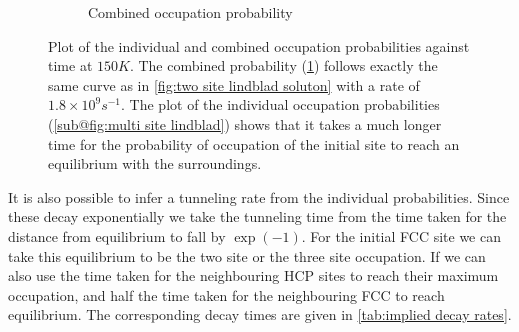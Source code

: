 \begin{figure}[htbp]
\begin{subfigure}{0.45\linewidth}
        \caption{Combined occupation probability
        }\label{sub@fig:multi site combined lindblad}
    \end{subfigure}
    \caption{Plot of the individual and combined
    occupation probabilities against time at
    \(150K\). The combined
    probability
    (\cref{sub@fig:multi site combined lindblad})
    follows exactly the same curve as in
    \cref{fig:two site lindblad soluton}
    with a rate of \(1.8\times{}10^{9}s^{-1}\).
    The plot of the individual occupation
    probabilities
    (\cref{sub@fig:multi site lindblad})
    shows that it takes
    a much longer time for the
    probability of occupation of the
    initial site to reach
    an equilibrium with the surroundings.}\label{fig:multi site lindblad}
\end{figure}
It is also possible to infer a
tunneling rate from the
individual probabilities.
Since these decay
exponentially we take the tunneling
time from the time taken for the
distance from equilibrium
to fall by \(\exp{(-1)}\).
For the initial
FCC site we can
take this equilibrium
to be the two site or
the three site occupation.
If we can also
use the time taken for the
neighbouring HCP sites to
reach their maximum occupation,
and half the time taken for the
neighbouring FCC to reach equilibrium.
The corresponding decay times are
given in \cref{tab:implied decay rates}.
